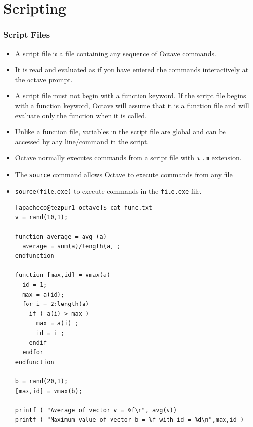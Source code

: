 \documentclass[t,compress,xcolor=svgnames]{beamer}
\begin{document}
\section{Scripting}
\begin{frame}
  \frametitle{\small Script Files}
  \begin{itemize}
    \item A script file is a file containing any sequence of Octave commands.
    \item It is read and evaluated as if you have entered the commands interactively at the octave prompt.
    \item A script file must not begin with a function keyword. If the script file begins with a function keyword, Octave will assume that it is a function file and will evaluate only the function when it is called.
    \item Unlike a function file, variables in the script file are global and can be accessed by any line/command in the script.
    \item Octave normally executes commands from a script file with a \texttt{.m} extension.
    \item The \texttt{source} command allows Octave to execute commands from any file
    \item[] \texttt{source(file.exe)} to execute commands in the \texttt{file.exe} file.
    {\tiny
      \begin{verbatim}
[apacheco@tezpur1 octave]$ cat func.txt
v = rand(10,1);

function average = avg (a)
  average = sum(a)/length(a) ;
endfunction

function [max,id] = vmax(a)
  id = 1;
  max = a(id);
  for i = 2:length(a)
    if ( a(i) > max )
      max = a(i) ;
      id = i ;
    endif
  endfor
endfunction

b = rand(20,1);
[max,id] = vmax(b); 

printf ( "Average of vector v = %f\n", avg(v)) 
printf ( "Maximum value of vector b = %f with id = %d\n",max,id )


\end{verbatim}}
\end{itemize}
\end{frame}
\end{document}
